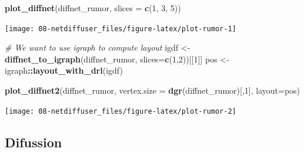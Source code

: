 \documentclass[]{book}
\newenvironment{Shaded}{\begin{snugshade}}{\end{snugshade}}
\newcommand{\CommentTok}[1]{\textcolor[rgb]{0.56,0.35,0.01}{\textit{#1}}}
\newcommand{\ControlFlowTok}[1]{\textcolor[rgb]{0.13,0.29,0.53}{\textbf{#1}}}
\newcommand{\DataTypeTok}[1]{\textcolor[rgb]{0.13,0.29,0.53}{#1}}
\newcommand{\DecValTok}[1]{\textcolor[rgb]{0.00,0.00,0.81}{#1}}
\newcommand{\KeywordTok}[1]{\textcolor[rgb]{0.13,0.29,0.53}{\textbf{#1}}}
\newcommand{\NormalTok}[1]{#1}
\newcommand{\OperatorTok}[1]{\textcolor[rgb]{0.81,0.36,0.00}{\textbf{#1}}}
\newcommand{\OtherTok}[1]{\textcolor[rgb]{0.56,0.35,0.01}{#1}}
\newcommand{\StringTok}[1]{\textcolor[rgb]{0.31,0.60,0.02}{#1}}
\begin{document}
\begin{Shaded}
\begin{Highlighting}[]
\KeywordTok{plot_diffnet}\NormalTok{(diffnet_rumor, }\DataTypeTok{slices =} \KeywordTok{c}\NormalTok{(}\DecValTok{1}\NormalTok{, }\DecValTok{3}\NormalTok{, }\DecValTok{5}\NormalTok{))}
\end{Highlighting}
\end{Shaded}

\begin{center}\texttt{[image: 08-netdiffuser\_files/figure-latex/plot-rumor-1]} \end{center}

\begin{Shaded}
\begin{Highlighting}[]
\CommentTok{# We want to use igraph to compute layout}
\NormalTok{igdf <-}\StringTok{ }\KeywordTok{diffnet_to_igraph}\NormalTok{(diffnet_rumor, }\DataTypeTok{slices=}\KeywordTok{c}\NormalTok{(}\DecValTok{1}\NormalTok{,}\DecValTok{2}\NormalTok{))[[}\DecValTok{1}\NormalTok{]]}
\NormalTok{pos <-}\StringTok{ }\NormalTok{igraph}\OperatorTok{::}\KeywordTok{layout_with_drl}\NormalTok{(igdf)}

\KeywordTok{plot_diffnet2}\NormalTok{(diffnet_rumor, }\DataTypeTok{vertex.size =} \KeywordTok{dgr}\NormalTok{(diffnet_rumor)[,}\DecValTok{1}\NormalTok{], }\DataTypeTok{layout=}\NormalTok{pos)}
\end{Highlighting}
\end{Shaded}

\begin{center}\texttt{[image: 08-netdiffuser\_files/figure-latex/plot-rumor-2]} \end{center}

\hypertarget{difussion}{%
\subsection{Difussion}\label{difussion}}

\begin{Shaded}
\end{Shaded}
\end{document}

